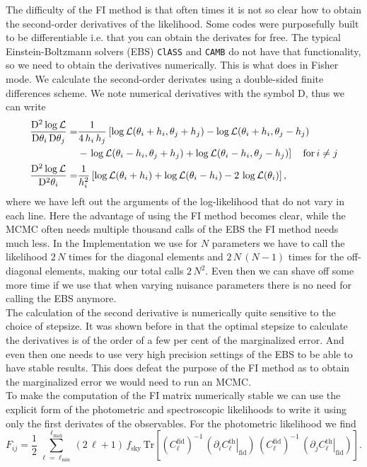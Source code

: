 \documentclass[../main.tex]{subfiles}
\begin{document}
The difficulty of the FI method is that often times it is not so clear how to obtain the second-order derivatives of the likelihood. Some codes were purposefully built to be differentiable i.e. that you can obtain the derivates for free. The typical Einstein-Boltzmann solvers (EBS) {\tt ClASS}\cite{Blas:2011rf} and {\tt CAMB}\cite{Lewis:1999bs} do not have that functionality, so we need to obtain the derivatives numerically. This is what \montepython does in Fisher mode. We calculate the second-order derivates using a double-sided finite differences scheme. We note numerical derivatives with the symbol D, thus we can write 
\begin{align}
    \frac{\mathrm{D}^2 \log\mathcal{L}}{\mathrm{D} \theta_i \, \mathrm{D} \theta_j} =& \frac{1}{4\,h_i\,h_j}\left[\log\mathcal{L}(\theta_i+h_i,\theta_j+h_j)-\log\mathcal{L}(\theta_i+h_i,\theta_j-h_j)\right. \nonumber\\
&-\left.\log\mathcal{L}(\theta_i-h_i,\theta_j+h_j)+\log\mathcal{L}(\theta_i-h_i,\theta_j-h_j)\right]\quad \text{for}\,i\neq j\\
    \frac{\mathrm{D}^2 \log\mathcal{L}}{\mathrm{D}^2 \theta_i} =&  \frac{1}{h_i^2} \left[\log\mathcal{L}(\theta_i+h_i)+\log\mathcal{L}(\theta_i-h_i)-2\,\log\mathcal{L}(\theta_i)\right],
\end{align}
where we have left out the arguments of the log-likelihood that do not vary in each line. Here the advantage of using the FI method becomes clear, while the MCMC often needs multiple thousand calls of the EBS the FI method needs much less. In the Implementation we use for $N$ parameters we have to call the likelihood $2\, N$ times for the diagonal elements and $2\, N\,(N-1)$ times for the off-diagonal elements, making our total calls $2\, N^2$. Even then we can shave off some more time if we use that when varying nuisance parameters there is no need for calling the EBS anymore.\\
The calculation of the second derivative is numerically quite sensitive to the choice of stepsize. It was shown before in \cite{casas2023euclid} that the optimal stepsize to calculate the derivatives is of the order of a few per cent of the marginalized error. And even then one needs to use very high precision settings of the EBS to be able to have stable results. This does defeat the purpose of the FI method as to obtain the marginalized error we would need to run an MCMC.\\
To make the computation of the FI matrix numerically stable we can use the explicit form of the photometric and spectroscopic likelihoods to write it using only the first derivates of the observables. For the photometric likelihood we find \begin{equation}
    F_{ij} = \frac{1}{2}\,\sum_{\ell=\ell_\mathrm{min}}^{\ell_\mathrm{max}} (2\,\ell+1)\,f_\mathrm{sky}\,\mathrm{Tr}\left[\left(C_\ell^\mathrm{fid}\right)^{-1}\,\left(\left.\partial_i C^\mathrm{th}_\ell\right|_\mathrm{fid}\right)\,\left(C_\ell^\mathrm{fid}\right)^{-1}\,\left(\left.\partial_j C^\mathrm{th}_\ell\right|_\mathrm{fid}\right)\right].
\end{equation}
\end{document}
